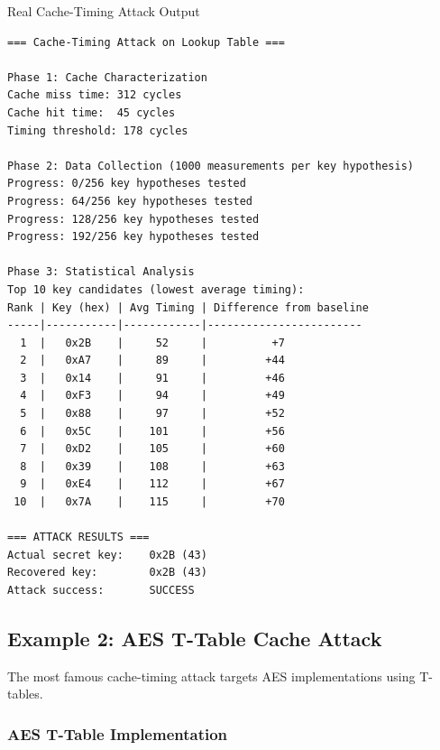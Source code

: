 \documentclass[11pt,a4paper]{article}
\theoremstyle{definition}
\begin{document}
\begin{examplebox}{Real Cache-Timing Attack Output}
\begin{verbatim}
=== Cache-Timing Attack on Lookup Table ===

Phase 1: Cache Characterization
Cache miss time: 312 cycles
Cache hit time:  45 cycles
Timing threshold: 178 cycles

Phase 2: Data Collection (1000 measurements per key hypothesis)
Progress: 0/256 key hypotheses tested
Progress: 64/256 key hypotheses tested
Progress: 128/256 key hypotheses tested
Progress: 192/256 key hypotheses tested

Phase 3: Statistical Analysis
Top 10 key candidates (lowest average timing):
Rank | Key (hex) | Avg Timing | Difference from baseline
-----|-----------|------------|------------------------
  1  |   0x2B    |     52     |          +7
  2  |   0xA7    |     89     |         +44
  3  |   0x14    |     91     |         +46
  4  |   0xF3    |     94     |         +49
  5  |   0x88    |     97     |         +52
  6  |   0x5C    |    101     |         +56
  7  |   0xD2    |    105     |         +60
  8  |   0x39    |    108     |         +63
  9  |   0xE4    |    112     |         +67
 10  |   0x7A    |    115     |         +70

=== ATTACK RESULTS ===
Actual secret key:    0x2B (43)
Recovered key:        0x2B (43)  
Attack success:       SUCCESS
\end{verbatim}
\end{examplebox}

\subsection{Example 2: AES T-Table Cache Attack}

The most famous cache-timing attack targets AES implementations using T-tables.

\subsubsection{AES T-Table Implementation}
\end{document}
